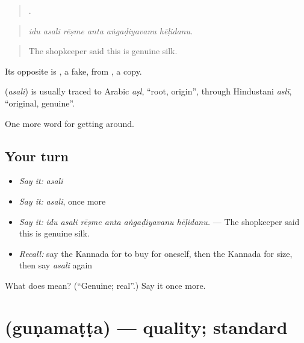 \begin{quote}
     .
\end{quote}

\begin{quote}
\emph{idu asali rēṣme anta aṅgaḍiyavanu hēḷidanu.}
\end{quote}

\begin{quote}
The shopkeeper said this is genuine silk.
\end{quote}

Its opposite is , a fake, from , a copy.

\begin{cousinweb}
\textbf{} (\emph{asali}) is usually traced to Arabic \emph{aṣl}, \textquotedblleft{}root, origin\textquotedblright{}, through Hindustani \emph{aslī}, \textquotedblleft{}original, genuine\textquotedblright{}.
\end{cousinweb}

\begin{grammarlens}[title={What you've built}]
One more word for getting around.
\end{grammarlens}

\subsection*{Your turn}
\begin{itemize}
\raggedright
  \item \emph{Say it:} \emph{asali}
  \item \emph{Say it:} \emph{asali}, once more
  \item \emph{Say it:} \emph{idu asali rēṣme anta aṅgaḍiyavanu hēḷidanu.} — The shopkeeper said this is genuine silk.
  \item \emph{Recall:} say the Kannada for to buy for oneself, then the Kannada for size, then say \emph{asali} again
\end{itemize}

\begin{tcolorbox}[breakable,colback=teal!4,colframe=teal!35!black,title={Before you move on}]
What does  mean? (\textquotedblleft{}Genuine; real\textquotedblright{}.) Say it once more.
\end{tcolorbox}
\section[\texorpdfstring{\kn{ಗುಣಮಟ್ಟ} (guṇamaṭṭa)}{ಗುಣಮಟ್ಟ (guṇamaṭṭa)}]{ (guṇamaṭṭa) — quality; standard}

